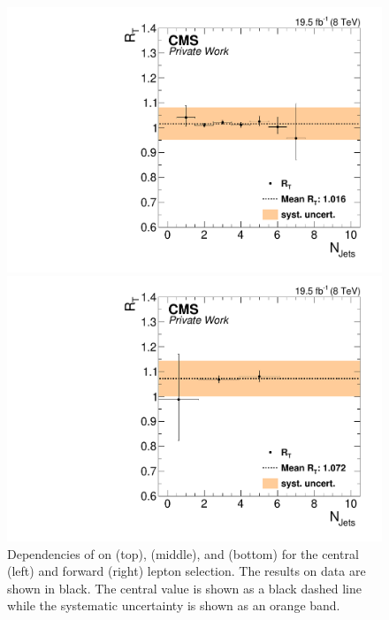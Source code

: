 \begin{figure}[htbp]
\begin{minipage}[t]{0.49\textwidth}
  \includegraphics[width=\textwidth]{plots/BG/trigger/Triggereff_SFvsOF_Syst_AlphaT_HighHTExclusiveCentral_Full2012_NJets_None.pdf}
\end{minipage}
\begin{minipage}[t]{0.49\textwidth}
\includegraphics[width=\textwidth]{plots/BG/trigger/Triggereff_SFvsOF_Syst_AlphaT_HighHTExclusiveForward_Full2012_NJets_None.pdf}
\end{minipage}
\caption{Dependencies of \RT on \mll (top), \MET (middle), and \njets (bottom) for the central (left) and forward (right) lepton selection. The results on data are shown in black. The central value is shown as a black dashed line while the systematic uncertainty is shown as an orange band.}
\label{fig:RTDependencies}
\end{figure} 
